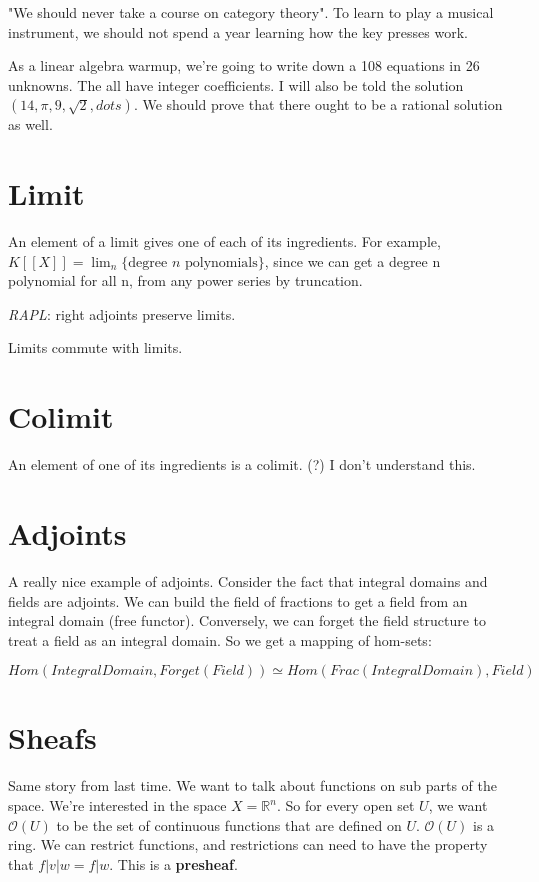 \documentclass{book}
\renewcommand{\O}{\ensuremath{\mathcal{O}}}
\theoremstyle{definition}
\begin{document}
"We should never take a course on category theory". To learn to play a musical
instrument, we should not spend a year learning how the key presses work.

As a linear algebra warmup, we're going to write down a 108 equations
in 26 unknowns. The all have integer coefficients. I will also be told the solution
$(14, \pi, 9, \sqrt{2}, dots)$.  We should prove that there ought to be a
rational solution as well.

\section{Limit}

An element of a limit gives one of each of its ingredients. For example,
$K[[X]] = \lim_n \{ \text{degree $n$ polynomials} \}$, since we can get
a degree n polynomial for all n, from any power series by truncation.

\emph{RAPL}: right adjoints preserve limits.

Limits commute with limits.


\section{Colimit}

An element of one of its ingredients is a colimit. (?) I don't understand this.

\section{Adjoints}

A really nice example of adjoints. Consider the fact that integral domains
and fields are adjoints. We can build the field of fractions to get a field
from an integral domain (free functor). Conversely, we can forget the
field structure to treat a field as an integral domain. So we get a mapping
of hom-sets:

$$
Hom(IntegralDomain, Forget(Field)) \simeq Hom(Frac(IntegralDomain), Field)
$$

\section{Sheafs}

Same story from last time. We want to talk about functions on sub parts of the space.
We're interested in the space $X = \mathbb R^n$.
So for every open set $U$, we want $\O(U)$ to be the set of continuous
functions that are defined on $U$. $\O(U)$ is a ring. We can restrict functions,
and restrictions can need to have the property that $f|v|w = f|w$. This is
a \textbf{presheaf}.
\end{document}
